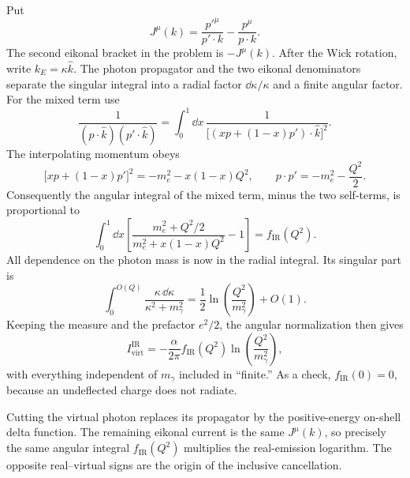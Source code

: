 \begin{enumerate}
Put
\[
 J^\mu(k)=\frac{p'^\mu}{p'\cdot k}-\frac{p^\mu}{p\cdot k}.
\]
The second eikonal bracket in the problem is \(-J^\mu(k)\).  After the
Wick rotation, write \(k_E=\kappa\widehat k\).  The photon propagator and
the two eikonal denominators separate the singular integral into a radial
factor \(\dd\kappa/\kappa\) and a finite angular factor.  For the mixed term
use
\[
 \frac{1}{(p\cdot\widehat k)(p'\cdot\widehat k)}
 =\int_0^1\dd x\,
 \frac{1}{\bigl[(xp+(1-x)p')\cdot\widehat k\bigr]^2}.
\]
The interpolating momentum obeys
\[
 \bigl[xp+(1-x)p'\bigr]^2
 =-m_e^2-x(1-x)Q^2,
 \qquad p\cdot p'=-m_e^2-\frac{Q^2}{2}.
\]
Consequently the angular integral of the mixed term, minus the two
self-terms, is proportional to
\[
 \int_0^1\dd x\left[
 \frac{m_e^2+Q^2/2}{m_e^2+x(1-x)Q^2}-1\right]
 =f_{\mathrm{IR}}(Q^2).
\]
All dependence on the photon mass is now in the radial integral.  Its
singular part is
\[
 \int^{O(Q)}_0\frac{\kappa\,\dd\kappa}
 {\kappa^2+m_\gamma^2}
 =\frac12\ln\!\left(\frac{Q^2}{m_\gamma^2}\right)+O(1).
\]
Keeping the measure and the prefactor \(e^2/2\), the angular normalization
then gives
\[
 I_{\mathrm{virt}}^{\mathrm{IR}}
 =-\frac{\alpha}{2\pi}f_{\mathrm{IR}}(Q^2)
 \ln\!\left(\frac{Q^2}{m_\gamma^2}\right),
\]
with everything independent of \(m_\gamma\) included in ``finite.''  As a
check, \(f_{\mathrm{IR}}(0)=0\), because an undeflected charge does not
radiate.

Cutting the virtual photon replaces its propagator by the positive-energy
on-shell delta function.  The remaining eikonal current is the same
\(J^\mu(k)\), so precisely the same angular integral
\(f_{\mathrm{IR}}(Q^2)\) multiplies the real-emission logarithm.  The
opposite real--virtual signs are the origin of the inclusive cancellation.


\end{enumerate}
